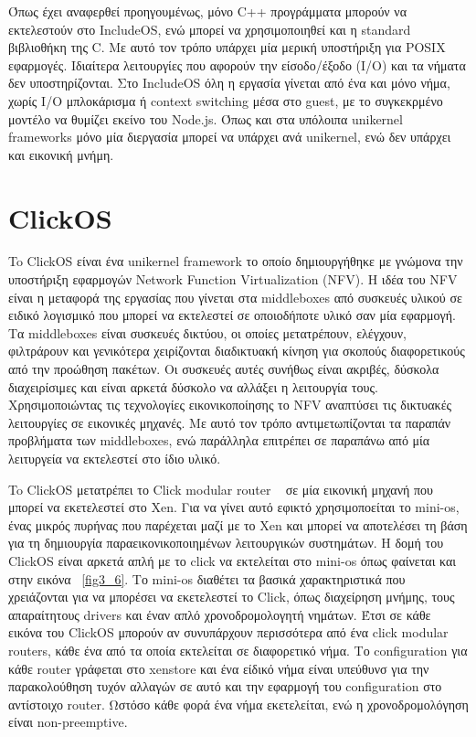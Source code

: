 Όπως έχει αναφερθεί προηγουμένως, μόνο C++ προγράμματα μπορούν να εκτελεστούν
στο IncludeOS, ενώ μπορεί να χρησιμοποιηθεί και η standard βιβλιοθήκη της C. Με
αυτό τον τρόπο υπάρχει μία μερική υποστήριξη για POSIX εφαρμογές. Ιδιαίτερα
λειτουργίες που αφορούν την είσοδο/έξοδο (Ι/Ο) και τα νήματα δεν υποστηρίζονται.
Στο IncludeOS όλη η εργασία γίνεται από ένα και μόνο νήμα, χωρίς I/O μπλοκάρισμα
ή context switching μέσα στο guest, με το συγκεκρμένο μοντέλο να θυμίζει εκείνο
του Node.js. Όπως και στα υπόλοιπα unikernel frameworks μόνο μία διεργασία
μπορεί να υπάρχει ανά unikernel, ενώ δεν υπάρχει και εικονική μνήμη.


\section{ClickOS}
To ClickOS είναι ένα unikernel framework το οποίο δημιουργήθηκε με γνώμονα την
υποστήριξη εφαρμογών Network Function Virtualization (NFV). H ιδέα του NFV είναι
η μεταφορά της εργασίας που γίνεται στα middleboxes από συσκευές υλικού σε
ειδικό λογισμικό που μπορεί να εκτελεστεί σε οποιοδήποτε υλικό σαν μία εφαρμογή.
Τα middleboxes είναι συσκευές δικτύου, οι οποίες μετατρέπουν, ελέγχουν,
φιλτράρουν και γενικότερα χειρίζονται διαδικτυακή κίνηση για σκοπούς
διαφορετικούς από την προώθηση πακέτων. Οι συσκευές αυτές συνήθως είναι ακριβές,
δύσκολα διαχειρίσιμες και είναι αρκετά δύσκολο να αλλάξει η λειτουργία τους.
Χρησιμοποιώντας τις τεχνολογίες εικονικοποίησης το NFV αναπτύσει τις δικτυακές
λειτουργίες σε εικονικές μηχανές. Με αυτό τον τρόπο αντιμετωπίζονται τα παραπάν
προβλήματα των middleboxes, ενώ παράλληλα επιτρέπει σε παραπάνω από μία
λειτυργεία να εκτελεστεί στο ίδιο υλικό.

To ClickOS μετατρέπει το Click modular router ~\cite{kohler2000click} σε μία
εικονική μηχανή που μπορεί να εκετελεστεί στο Xen. Για να γίνει αυτό εφικτό
χρησιμοποείται το mini-os, ένας μικρός πυρήνας που παρέχεται μαζί με το Xen και
μπορεί να αποτελέσει τη βάση για τη δημιουργία παραεικονικοποιημένων
λειτουργικών συστημάτων. H δομή του ClickOS είναι αρκετά απλή με το click να
εκτελείται στο mini-os όπως φαίνεται και στην εικόνα ~\ref{fig3_6}. Το mini-os
διαθέτει τα βασικά χαρακτηριστικά που χρειάζονται για να μπορέσει να εκετελεστεί
το Click, όπως διαχείρηση μνήμης, τους απαραίτητους drivers και έναν απλό
χρονοδρομολογητή νημάτων. Έτσι σε κάθε εικόνα του ClickOS μπορούν αν συνυπάρχουν
περισσότερα από ένα click modular routers, κάθε ένα από τα οποία εκτελείται σε
διαφορετικό νήμα. Το configuration για κάθε router γράφεται στο xenstore και ένα
είδικό νήμα είναι υπεύθυνσ για την παρακολούθηση τυχόν αλλαγών σε αυτό και την
εφαρμογή του configuration στο αντίστοιχο router. Ωστόσο κάθε φορά ένα νήμα
εκετελείται, ενώ η χρονοδρομολόγηση είναι non-preemptive. 

